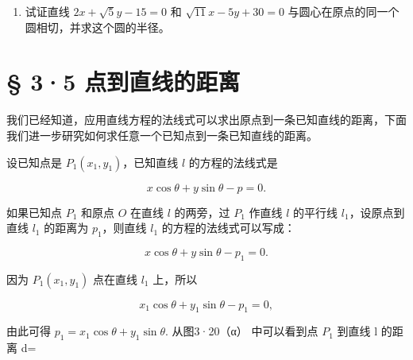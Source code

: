 \begin{enumerate}
\def\labelenumi{\arabic{enumi}.}
\setcounter{enumi}{8}
\tightlist
\item
  试证直线 \(2x + \sqrt{5} y - 15 = 0\) 和 \(\sqrt{11} x - 5y + 30 = 0\)
  与圆心在原点的同一个圆相切，并求这个圆的半径。
\end{enumerate}

\section{§ 3·5
点到直线的距离}\label{ux70b9ux5230ux76f4ux7ebfux7684ux8dddux79bb}

我们已经知道，应用直线方程的法线式可以求出原点到一条已知直线的距离，下面我们进一步研究如何求任意一个已知点到一条已知直线的距离。

设已知点是 \(P_{1}(x_{1},y_{1})\)，已知直线 \(l\) 的方程的法线式是

\[
x \cos \theta + y \sin \theta - p = 0.
\]

如果已知点 \(P_{1}\) 和原点 \(O\) 在直线 \(l\) 的两旁，过 \(P_{1}\)
作直线 \(l\) 的平行线 \(l_{1}\)，设原点到直线 \(l_{1}\) 的距离为
\(p_{1}\)，则直线 \(l_{1}\) 的方程的法线式可以写成：

\[
x \cos \theta + y \sin \theta - p_{1} = 0.
\]

因为 \(P_{1}(x_{1},y_{1})\) 点在直线 \(l_{1}\) 上，所以

\[
x_{1} \cos \theta + y_{1} \sin \theta - p_{1} = 0,
\]

由此可得 \(p_1 = x_1\cos \theta +y_1\sin \theta .\) 从图3·20（α）
中可以看到点 \(P_{1}\) 到直线 l 的距离 d=

